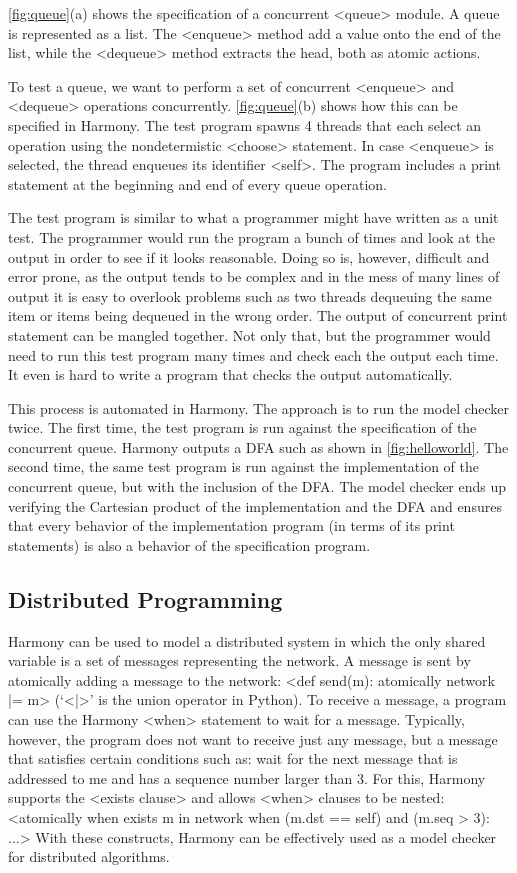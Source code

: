 \documentclass[twocolumn]{article}
\begin{document}
\autoref{fig:queue}(a) shows the specification of a concurrent
<{queue}> module.  A queue is represented as a list.
The <{enqueue}> method add a value onto the end of the list,
while the <{dequeue}> method extracts the head, both as atomic actions.

To test a queue, we want to perform a set of concurrent <{enqueue}>
and <{dequeue}> operations concurrently.
\autoref{fig:queue}(b) shows how this can be specified in Harmony.
The test program spawns 4 threads that each select an operation
using the nondetermistic <{choose}> statement.  In case <{enqueue}>
is selected, the thread enqueues its identifier <{self}>.  The program
includes a print statement at the beginning and end of every queue
operation.

The test program is similar to what a programmer might have written
as a unit test.  The programmer would run the program a bunch of
times and look at the output in order to see if it looks reasonable.
Doing so is, however, difficult and error prone, as the output tends
to be complex and in the mess of many lines of output it is easy
to overlook problems such as two threads dequeuing the same item
or items being dequeued in the wrong order.  The output of concurrent
print statement can be mangled together.  Not only that, but the
programmer would need to run this test program many times and check
each the output each time.  It even is hard to write a program that
checks the output automatically.

This process is automated in Harmony.  The approach is to
run the model checker twice.  The first time, the test program is
run against the specification of the concurrent queue.  Harmony
outputs a DFA such as shown in \autoref{fig:helloworld}.  The second
time, the same test program is run against the implementation of the
concurrent queue, but with the inclusion of the DFA.  The model
checker ends up verifying the Cartesian product of the implementation
and the DFA and ensures that every behavior of the implementation
program (in terms of its print statements) is also a behavior of
the specification program.

\subsection{Distributed Programming}

Harmony can be used to model a distributed system in which the
only shared variable is a set of messages representing the network.
A message is sent by atomically adding a message to the network:
<{def send(m): atomically network |= {m}}> (`<{|}>' is the union
operator in Python).
To receive a message, a program can use the Harmony <{when}>
statement to wait for a message.  Typically, however, the program
does not want to receive just any message, but a message that satisfies
certain conditions such as: wait for the next message that is addressed
to me and has a sequence number larger than 3.
For this, Harmony supports the <{exists clause}> and allows
<{when}> clauses to be nested:
<{atomically when exists m in network when (m.dst == self) and (m.seq > 3): ...}>
With these constructs, Harmony can be effectively used as a
model checker for distributed algorithms.
\end{document}
